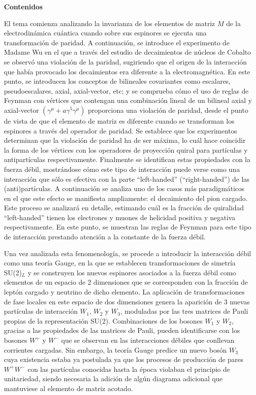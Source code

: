 \textbf{Contenidos}

El tema comienza analizando la invarianza de los elementos de matriz $M$ de la electrodinámica cuántica cuando sobre sus espinores se ejecuta una transformación de paridad. A continuación, se introduce el experimento de Madame Wu en el que a través del estudio de decaimientos de núcleos de Cobalto se observó una violación de la paridad, sugiriendo que el origen de la interacción que había provocado los decaimientos era diferente a la electromagnética. En este punto, se introducen los conceptos de bilineales covariantes como escalares, pseudoescalares, axial, axial-vector, etc; y se comprueba cómo el uso de reglas de Feynman con vértices que contengan una combinación lineal de un bilineal axial y axial-vector $(\gamma^\mu + a\gamma^5\gamma^\mu)$ proporciona una violación de paridad, desde el punto de vista de que el elemento de matriz es diferente cuando se transforman los espinores a través del operador de paridad. Se establece que los experimentos determinan que la violación de paridad ha de ser máxima, lo cuál hace coincidir la forma de los vértices con los operadores de proyección quiral para partículas y antipartículas respectivamente. Finalmente se identifican estas propiedades con la fuerza débil, mostrándose cómo este tipo de interacción puede verse como una interacción que sólo es efectiva con la parte ``left-handed'' (``right-handed'') de las (anti)partículas. A continuación se analiza uno de los casos más paradigmáticos en el que este efecto se manifiesta ampliamente: el decaimiento del pion cargado. Este proceso se analizará en detalle, estimando cuál es la fracción de quiralidad ``left-handed'' tienen los electrones y muones de helicidad positiva y negativa respectivamente. En este punto, se muestran las reglas de Feynman para este tipo de interacción prestando atención a la constante de la fuerza débil.

Una vez analizada esta fenomenología, se procede a introducir la interacción débil como una teoría Gauge, en la que se establecen transformaciones de simetría SU(2)$_L$ y se construyen los nuevos espinores asociados a la fuerza débil como elementos de un espacio de 2 dimensiones que se corresponden con la fracción de leptón cargado y neutrino de dicho elemento. La aplicación de transformaciones de fase locales en este espacio de dos dimensiones genera la aparición de 3 nuevas partículas de interacción $W_1$, $W_2$ y $W_3$, moduladas por las tres matrices de Pauli propias de la representación SU(2). Combinaciones de los bosones $W_1$ y $W_2$, gracias a las propiedades de las matrices de Pauli, pueden identificarse con los bosones $W^+$ y $W^-$ que se observan en las interacciones débiles que conllevan corrientes cargadas. Sin embargo, la teoría Gauge predice un nuevo bosón $W_3$ cuya existencia estaba ya postulada ya que los procesos de producción de pares $W^+W^-$ con las partículas conocidas hasta la época violaban el principio de unitariedad, siendo necesaria la adición de algún diagrama adicional que mantuviese al elemento de matriz acotado.

